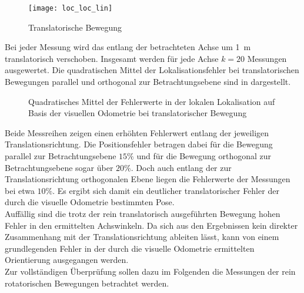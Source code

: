 \begin{figure}[!ht]
	\begin{center}
		\texttt{[image: loc\_loc\_lin]}
		\caption{Translatorische Bewegung}
		\label{fig.transmove}
	\end{center}
\end{figure}

Bei jeder Messung wird das \kps{} entlang der betrachteten Achse um \SI{1}{\meter} translatorisch verschoben. Insgesamt werden für jede Achse $k=20$ Messungen ausgewertet. Die quadratischen Mittel der Lokalisationsfehler bei translatorischen Bewegungen parallel und orthogonal zur Betrachtungsebene sind in  dargestellt.\\

\begin{figure}

\caption{Quadratisches Mittel der Fehlerwerte in der lokalen Lokalisation auf Basis der visuellen Odometrie bei translatorischer Bewegung}
\label{fig.loc_loc_trans}
\end{figure}

Beide Messreihen zeigen einen erhöhten Fehlerwert entlang der jeweiligen Translationsrichtung. Die Positionsfehler betragen dabei für die Bewegung parallel zur Betrachtungsebene $15\%$ und für die Bewegung orthogonal zur Betrachtungsebene sogar über $20\%$. Doch auch entlang der zur Translationsrichtung orthogonalen Ebene liegen die Fehlerwerte der Messungen bei etwa $10\%$. Es ergibt sich damit ein deutlicher translatorischer Fehler der durch die visuelle Odometrie bestimmten Pose.\\

Auffällig sind die trotz der rein translatorisch ausgeführten Bewegung hohen Fehler in den ermittelten Achswinkeln. Da sich aus den Ergebnissen kein direkter Zusammenhang mit der Translationsrichtung ableiten lässt, kann von einem grundlegenden Fehler in der durch die visuelle Odometrie ermittelten Orientierung ausgegangen werden.\\
Zur vollständigen Überprüfung sollen dazu im Folgenden die Messungen der rein rotatorischen Bewegungen betrachtet werden.


